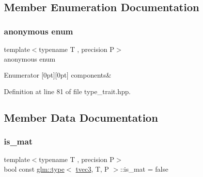 \subsection{Member Enumeration Documentation}
\mbox{\label{structglm_1_1type_3_01tvec3_00_01_t_00_01_p_01_4_ae2ed44078c22b099667c031cecea1d5c}} 
\subsubsection{\texorpdfstring{anonymous enum}{anonymous enum}}
{\footnotesize\ttfamily template$<$typename T , precision P$>$ \\
anonymous enum}

\begin{DoxyEnumFields}{Enumerator}
[0pt][0pt]{}\mbox{\label{structglm_1_1type_3_01tvec3_00_01_t_00_01_p_01_4_ae2ed44078c22b099667c031cecea1d5cac64bc0270614bf0e2d5def43741771dc}} 
components&\\
\hline

\end{DoxyEnumFields}


Definition at line 81 of file type\+\_\+trait.\+hpp.



\subsection{Member Data Documentation}
\mbox{\label{structglm_1_1type_3_01tvec3_00_01_t_00_01_p_01_4_aa59dc278af68be9ba7ca8f98b5a25630}} 
\subsubsection{\texorpdfstring{is\_mat}{is\_mat}}
{\footnotesize\ttfamily template$<$typename T , precision P$>$ \\
bool const \mbox{\hyperlink{structglm_1_1type}{glm\+::type}}$<$ \mbox{\hyperlink{structglm_1_1tvec3}{tvec3}}, T, P $>$\+::is\+\_\+mat = false\hspace{0.3cm}{\ttfamily [static]}}



